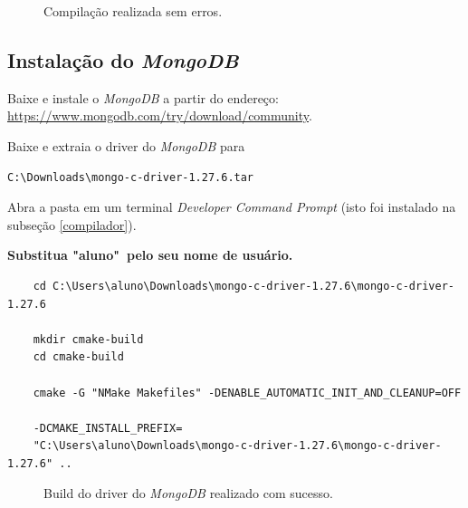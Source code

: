 \documentclass[a4paper,11pt]{article}
\newcommand{\mongo}{\textit{MongoDB}}
\newcommand{\cautionbox}[1]{
	\vskip 5mm
	\begin{leftbar}
		\textbf{#1}
	\end{leftbar}
	\vskip 5mm
}
\begin{document}
\begin{enumerate}
\begin{figure}[H]
	\centering
	\caption{Compilação realizada sem erros.}\label{fig:qt_no_error_compile}
\end{figure}

\end{enumerate}


\subsection{Instalação do \mongo{}}

Baixe e instale o \mongo{} a partir do endereço: \url{https://www.mongodb.com/try/download/community}.

Baixe e extraia o driver do \mongo{} para

\begin{mdframed}
	\begin{verbatim}
C:\Downloads\mongo-c-driver-1.27.6.tar
	\end{verbatim}
\end{mdframed}

Abra a pasta em um terminal \textit{Developer Command Prompt} (isto foi instalado na subseção \ref{compilador}).

\cautionbox{Substitua "aluno"\ pelo seu nome de usuário.}

\small
\begin{mdframed}
\begin{verbatim}
	cd C:\Users\aluno\Downloads\mongo-c-driver-1.27.6\mongo-c-driver-1.27.6
	
	mkdir cmake-build
	cd cmake-build
	
	cmake -G "NMake Makefiles" -DENABLE_AUTOMATIC_INIT_AND_CLEANUP=OFF
	
	-DCMAKE_INSTALL_PREFIX=
	"C:\Users\aluno\Downloads\mongo-c-driver-1.27.6\mongo-c-driver-1.27.6" ..
\end{verbatim}
\end{mdframed}
\normalsize

\begin{figure}[H]
	\centering
	\caption{Build do driver do \mongo{} realizado com sucesso.}\label{fig:mongodb_build}
\end{figure}
\end{document}
